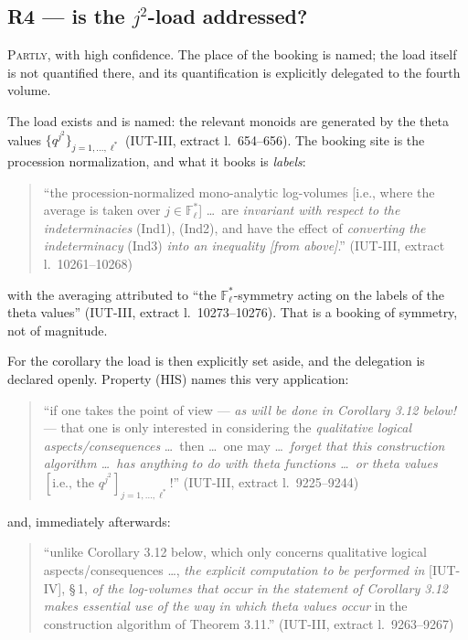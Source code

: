 \documentclass[11pt,a4paper]{article}
\theoremstyle{definition}
\newcommand{\anchor}[2]{(#1, extract l.~#2)}
\begin{document}
\subsection{R4 --- is the \texorpdfstring{$j^2$}{j\texttwosuperior}-load addressed?}

\textsc{Partly}, with high confidence. The place of the booking is named; the load
itself is not quantified there, and its quantification is explicitly delegated to
the fourth volume.

The load exists and is named: the relevant monoids are generated by the theta
values $\{q^{j^2}\}_{j=1,\dots,\ell^*}$ \anchor{IUT-III}{654--656}. The booking
site is the procession normalization, and what it books is \emph{labels}:

\begin{quote}\small
``the procession-normalized mono-analytic log-volumes [i.e., where the average is
taken over $j \in \mathbb{F}_\ell^*$] \dots\ are \emph{invariant with respect to
the indeterminacies} (Ind1), (Ind2), and have the effect of \emph{converting the
indeterminacy} (Ind3) \emph{into an inequality [from above]}.''
\hfill\anchor{IUT-III}{10261--10268}
\end{quote}

with the averaging attributed to ``the $\mathbb{F}_\ell^*$-symmetry acting on the
labels of the theta values'' \anchor{IUT-III}{10273--10276}. That is a booking of
symmetry, not of magnitude.

For the corollary the load is then explicitly set aside, and the delegation is
declared openly. Property (HIS) names this very application:

\begin{quote}\small
``if one takes the point of view --- \emph{as will be done in Corollary 3.12
below!} --- that one is only interested in considering the \emph{qualitative
logical aspects/consequences} \dots\ then \dots\ one may \dots\ \emph{forget that
this construction algorithm \dots\ has anything to do with theta functions \dots\
or theta values} $[\text{i.e., the } q^{j^2}]_{j=1,\dots,\ell^*}$!''
\hfill\anchor{IUT-III}{9225--9244}
\end{quote}

and, immediately afterwards:

\begin{quote}\small
``unlike Corollary 3.12 below, which only concerns qualitative logical
aspects/consequences \dots, \emph{the explicit computation to be performed in}
[IUT-IV], \S\,1, \emph{of the log-volumes that occur in the statement of Corollary
3.12 makes essential use of the way in which theta values occur} in the
construction algorithm of Theorem 3.11.'' \hfill\anchor{IUT-III}{9263--9267}
\end{quote}
\end{document}
